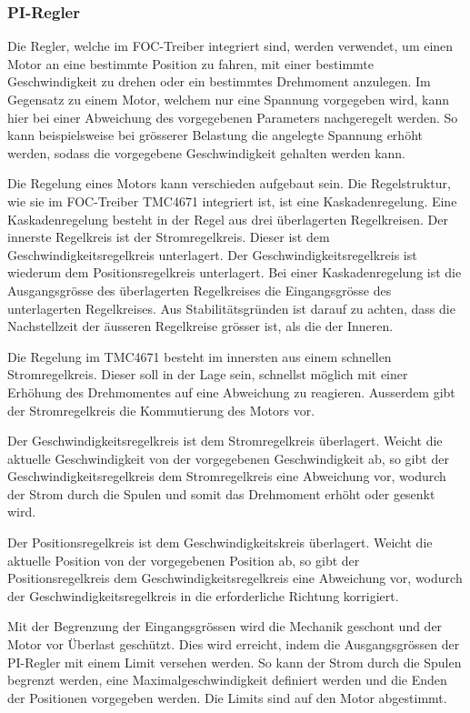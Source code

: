 \subsubsection{PI-Regler}
\label{subsubsec:PI_Regler}

Die Regler, welche im FOC-Treiber integriert sind, werden verwendet, um einen Motor an eine bestimmte Position zu fahren, mit einer bestimmte Geschwindigkeit zu drehen oder ein bestimmtes Drehmoment anzulegen. Im Gegensatz zu einem Motor, welchem nur eine Spannung vorgegeben wird, kann hier bei einer Abweichung des vorgegebenen Parameters nachgeregelt werden. So kann beispielsweise bei grösserer Belastung die angelegte Spannung erhöht werden, sodass die vorgegebene Geschwindigkeit gehalten werden kann.

Die Regelung eines Motors kann verschieden aufgebaut sein. Die Regelstruktur, wie sie im FOC-Treiber TMC4671 integriert ist, ist eine Kaskadenregelung. Eine Kaskadenregelung besteht in der Regel aus drei überlagerten Regelkreisen. Der innerste Regelkreis ist der Stromregelkreis. Dieser ist dem Geschwindigkeitsregelkreis unterlagert. Der Geschwindigkeitsregelkreis ist wiederum dem Positionsregelkreis unterlagert. Bei einer Kaskadenregelung ist die Ausgangsgrösse des überlagerten Regelkreises die Eingangsgrösse des unterlagerten Regelkreises. Aus Stabilitätsgründen ist darauf zu achten, dass die Nachstellzeit der äusseren Regelkreise grösser ist, als die der Inneren.


Die Regelung im TMC4671 besteht im innersten aus einem schnellen Stromregelkreis. Dieser soll in der Lage sein, schnellst möglich mit einer Erhöhung des Drehmomentes auf eine Abweichung zu reagieren. Ausserdem gibt der Stromregelkreis die Kommutierung des Motors vor.

Der Geschwindigkeitsregelkreis ist dem Stromregelkreis überlagert. Weicht die aktuelle Geschwindigkeit von der vorgegebenen Geschwindigkeit ab, so gibt der Geschwindigkeitsregelkreis dem Stromregelkreis eine Abweichung vor, wodurch der Strom durch die Spulen und somit das Drehmoment erhöht oder gesenkt wird.

Der Positionsregelkreis ist dem Geschwindigkeitskreis überlagert. Weicht die aktuelle Position von der vorgegebenen Position ab, so gibt der Positionsregelkreis dem Geschwindigkeitsregelkreis eine Abweichung vor, wodurch der Geschwindigkeitsregelkreis in die erforderliche Richtung korrigiert.

Mit der Begrenzung der Eingangsgrössen wird die Mechanik geschont und der Motor vor Überlast geschützt. Dies wird erreicht, indem die Ausgangsgrössen der PI-Regler mit einem Limit versehen werden. So kann der Strom durch die Spulen begrenzt werden, eine Maximalgeschwindigkeit definiert werden und die Enden der Positionen vorgegeben werden. Die Limits sind auf den Motor abgestimmt. \cite{stahl_simulation_2014}

